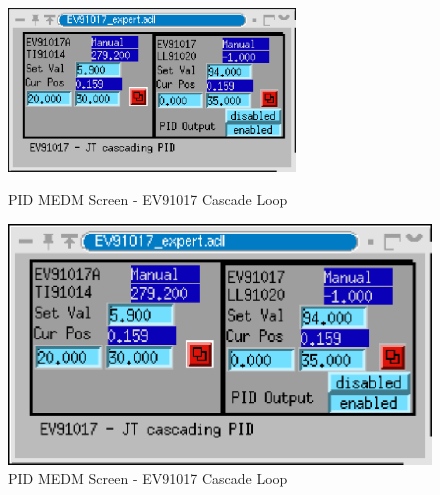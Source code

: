 \begin{figure}[h!]
\begin{latexonly}
\centering
\includegraphics[width=3in]{ev91017_cascade.eps}
\caption{PID MEDM Screen - EV91017 Cascade Loop}
\label{fig:ev17c}
\end{latexonly}
\begin{htmlonly}
\includegraphics{ev91017_cascade.eps}
\caption{PID MEDM Screen - EV91017 Cascade Loop}
\label{fig:ev17c}
\end{htmlonly}
\end{figure}


